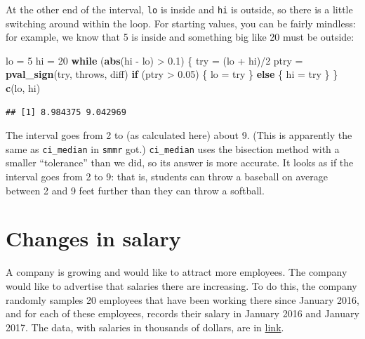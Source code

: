 \documentclass[]{tufte-book}
\newenvironment{Shaded}{}{}
\newcommand{\ControlFlowTok}[1]{\textcolor[rgb]{0.00,0.44,0.13}{\textbf{#1}}}
\newcommand{\DecValTok}[1]{\textcolor[rgb]{0.25,0.63,0.44}{#1}}
\newcommand{\FloatTok}[1]{\textcolor[rgb]{0.25,0.63,0.44}{#1}}
\newcommand{\KeywordTok}[1]{\textcolor[rgb]{0.00,0.44,0.13}{\textbf{#1}}}
\newcommand{\NormalTok}[1]{#1}
\newcommand{\OperatorTok}[1]{\textcolor[rgb]{0.40,0.40,0.40}{#1}}
\newcommand{\StringTok}[1]{\textcolor[rgb]{0.25,0.44,0.63}{#1}}
\theoremstyle{definition}
\theoremstyle{definition}
\theoremstyle{definition}
\theoremstyle{remark}
\begin{document}
At the other end of the interval, \texttt{lo} is inside and \texttt{hi}
is outside, so there is a little switching around within the loop. For
starting values, you can be fairly mindless: for example, we know that 5
is inside and something big like 20 must be outside:

\begin{Shaded}
\begin{Highlighting}[]
\NormalTok{lo =}\StringTok{ }\DecValTok{5}
\NormalTok{hi =}\StringTok{ }\DecValTok{20}
\ControlFlowTok{while}\NormalTok{ (}\KeywordTok{abs}\NormalTok{(hi }\OperatorTok{-}\StringTok{ }\NormalTok{lo) }\OperatorTok{>}\StringTok{ }\FloatTok{0.1}\NormalTok{) \{}
\NormalTok{    try =}\StringTok{ }\NormalTok{(lo }\OperatorTok{+}\StringTok{ }\NormalTok{hi)}\OperatorTok{/}\DecValTok{2}
\NormalTok{    ptry =}\StringTok{ }\KeywordTok{pval_sign}\NormalTok{(try, throws, diff)}
    \ControlFlowTok{if}\NormalTok{ (ptry }\OperatorTok{>}\StringTok{ }\FloatTok{0.05}\NormalTok{) \{}
\NormalTok{        lo =}\StringTok{ }\NormalTok{try}
\NormalTok{    \} }\ControlFlowTok{else}\NormalTok{ \{}
\NormalTok{        hi =}\StringTok{ }\NormalTok{try}
\NormalTok{    \}}
\NormalTok{\}}
\KeywordTok{c}\NormalTok{(lo, hi)}
\end{Highlighting}
\end{Shaded}

\begin{verbatim}
## [1] 8.984375 9.042969
\end{verbatim}

The interval goes from 2 to (as calculated here) about 9. (This is
apparently the same as \texttt{ci\_median} in \texttt{smmr} got.)
\texttt{ci\_median} uses the bisection method with a smaller
``tolerance'' than we did, so its answer is more accurate. It looks as
if the interval goes from 2 to 9: that is, students can throw a baseball
on average between 2 and 9 feet further than they can throw a softball.

\hypertarget{changes-in-salary}{%
\section{Changes in salary}\label{changes-in-salary}}

A company is growing and would like to attract more employees. The
company would like to advertise that salaries there are increasing. To
do this, the company randomly samples 20 employees that have been
working there since January 2016, and for each of these employees,
records their salary in January 2016 and January 2017. The data, with
salaries in thousands of dollars, are in
\href{https://www.utsc.utoronto.ca/~butler/c32/salaryinc.txt}{link}.
\end{document}
